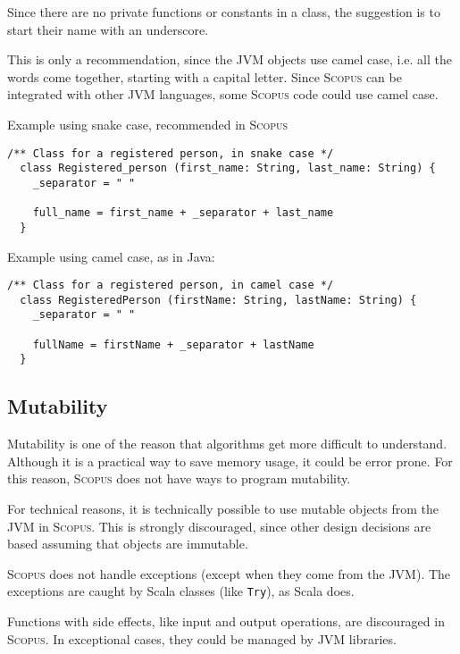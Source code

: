 \documentclass[12pt,a4paper]{article}
\newcommand{\srccode}[1]{\texttt{{#1}}}
\newcommand{\Scopus}{\textsc{Scopus}\xspace}
\begin{document}
    Since there are no private functions or constants in a class, the suggestion is to start their name with an underscore.

    This is only a recommendation, since the JVM objects use camel case, i.e. all the words come together, starting with a capital letter.
    Since \Scopus can be integrated with other JVM languages, some \Scopus code could use camel case.

    Example using snake case, recommended in \Scopus

    \begin{lstlisting}[label={lst:exampleExtends}]
  /** Class for a registered person, in snake case */
  class Registered_person (first_name: String, last_name: String) {
    _separator = " "

    full_name = first_name + _separator + last_name
  }
    \end{lstlisting}

    Example using camel case, as in Java:
    \begin{lstlisting}[label={lst:exampleExtends}]
  /** Class for a registered person, in camel case */
  class RegisteredPerson (firstName: String, lastName: String) {
    _separator = " "

    fullName = firstName + _separator + lastName
  }
    \end{lstlisting}

    \subsection{Mutability}

    Mutability is one of the reason that algorithms get more difficult to understand.
    Although it is a practical way to save memory usage, it could be error prone.
    For this reason, \Scopus does not have ways to program mutability.

    For technical reasons, it is technically possible to use mutable objects from the JVM in \Scopus.
    This is strongly discouraged, since other design decisions are based assuming that objects are immutable.

    \Scopus does not handle exceptions (except when they come from the JVM).
    The exceptions are caught by Scala classes (like \srccode{Try}), as Scala does.

    Functions with side effects, like input and output operations, are discouraged in \Scopus.
    In exceptional cases, they could be managed by JVM libraries.
\end{document}

